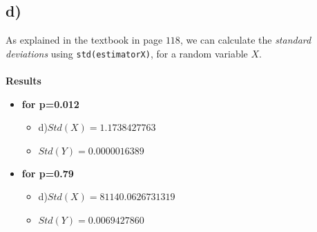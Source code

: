 \documentclass[12pt]{article}
\begin{document}
\subsection*{d)}
As explained in the textbook in page $118$, we can calculate the 
\textit{standard deviations} using \texttt{std(estimatorX)}, for a random 
variable $X$.
\\ \\
\textbf{Results}\\
\begin{itemize}
    \item[] \textbf{for p=0.012}
    \begin{itemize}
        \item[] d)$Std(X)=1.1738427763$
        \item[] \quad $Std(Y)=0.0000016389$
    \end{itemize}
    \item[] \textbf{for p=0.79}
    \begin{itemize}
        \item[] d)$Std(X)=81140.0626731319$
        \item[] \quad $Std(Y)=0.0069427860$
    \end{itemize}
\end{itemize}
\end{document}
